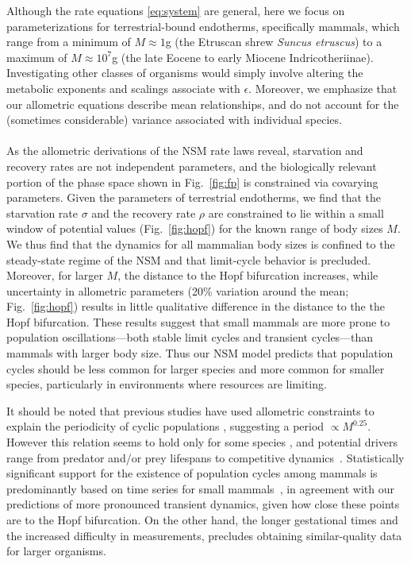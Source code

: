 \documentclass[11pt]{article}
\begin{document}
\begin{multicols}{2}
Although the rate equations \eqref{eq:system} are general, here we focus on
parameterizations for terrestrial-bound endotherms, specifically mammals,
which range from a minimum of $M\approx1$g (the Etruscan shrew
\emph{Suncus etruscus}) to a maximum of $M\approx10^7$g (the late Eocene
to early Miocene Indricotheriinae).  Investigating other classes of organisms
would simply involve altering the metabolic exponents and scalings associate
with $\epsilon$. Moreover, we emphasize that our allometric equations
describe mean relationships, and do not account for the (sometimes
considerable) variance associated with individual species.
\\

 \\
As the allometric derivations of the NSM rate laws reveal, starvation and recovery rates are not independent parameters, and the biologically relevant portion of the phase space shown in Fig.~\ref{fig:fp} is constrained via covarying parameters.  
Given the parameters of terrestrial endotherms, we find that the starvation rate $\sigma$ and the recovery rate $\rho$ are constrained to lie within a small window of potential values (Fig.~\ref{fig:hopf}) for the known range of body sizes $M$. 
We thus find that the dynamics for all mammalian body sizes is confined to the steady-state regime of the NSM and that limit-cycle behavior is precluded.
Moreover, for larger $M$, the distance to the Hopf bifurcation increases, while uncertainty in allometric parameters (20\% variation around the mean; Fig.~\ref{fig:hopf}) results in little qualitative difference in the distance to the the Hopf bifurcation. 
These results suggest that small mammals are more prone to population oscillations---both stable limit cycles and transient cycles---than mammals with larger body size.  
Thus our NSM model predicts that population cycles should be less common for larger species and more common for smaller species, particularly in environments where resources are limiting.

It should be noted that previous studies have used allometric constraints to explain the periodicity of cyclic populations \cite{CalderIII:1983jd,Peterson:1984hj,Krukonis:1991fk}, suggesting a period $\propto M^{0.25}$.  
However this relation seems to hold only for some species \cite{Hendriks:2012fc}, and potential drivers range from predator and/or prey lifespans to competitive dynamics~\cite{Kendall:1999iy,Hogstedt:2005cr}.
Statistically significant support for the existence of population cycles among mammals is predominantly based on time series for small mammals~\cite{Kendall:1998hl}, in agreement with our predictions of more pronounced transient dynamics, given how close these points are to the Hopf bifurcation.  
On the other hand, the longer gestational times and the increased difficulty in measurements, precludes obtaining similar-quality data for larger organisms.
\vspace{6mm}



\end{multicols}
\end{document}
